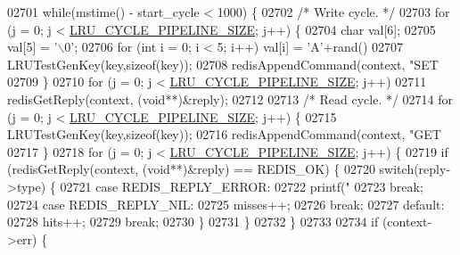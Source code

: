\begin{DoxyCode}
{{{{{{{{{{{{{{{{{{{{{{{{{{{{{{{{{{{{{{{{{{{{{{{{{{{{{{{{{{{{{{{{{{{{{{{{{{{{{{{{{{{{{{{{{{{{{{{{{{{{{{{{{{{{02701         \textcolor{keywordflow}{while}(mstime() - start\_cycle < 1000) \{
02702             \textcolor{comment}{/* Write cycle. */}
02703             \textcolor{keywordflow}{for} (j = 0; j < \hyperlink{redis-cli_8c_ae524234b44cd0249095699ac9f377254}{LRU\_CYCLE\_PIPELINE\_SIZE}; j++) \{
02704                 \textcolor{keywordtype}{char} val[6];
02705                 val[5] = \textcolor{stringliteral}{'\(\backslash\)0'};
02706                 \textcolor{keywordflow}{for} (\textcolor{keywordtype}{int} i = 0; i < 5; i++) val[i] = \textcolor{stringliteral}{'A'}+rand()%
02707                 LRUTestGenKey(key,\textcolor{keyword}{sizeof}(key));
02708                 redisAppendCommand(context, \textcolor{stringliteral}{"SET %
02709             \}
02710             \textcolor{keywordflow}{for} (j = 0; j < \hyperlink{redis-cli_8c_ae524234b44cd0249095699ac9f377254}{LRU\_CYCLE\_PIPELINE\_SIZE}; j++)
02711                 redisGetReply(context, (\textcolor{keywordtype}{void}**)&reply);
02712 
02713             \textcolor{comment}{/* Read cycle. */}
02714             \textcolor{keywordflow}{for} (j = 0; j < \hyperlink{redis-cli_8c_ae524234b44cd0249095699ac9f377254}{LRU\_CYCLE\_PIPELINE\_SIZE}; j++) \{
02715                 LRUTestGenKey(key,\textcolor{keyword}{sizeof}(key));
02716                 redisAppendCommand(context, \textcolor{stringliteral}{"GET %
02717             \}
02718             \textcolor{keywordflow}{for} (j = 0; j < \hyperlink{redis-cli_8c_ae524234b44cd0249095699ac9f377254}{LRU\_CYCLE\_PIPELINE\_SIZE}; j++) \{
02719                 \textcolor{keywordflow}{if} (redisGetReply(context, (\textcolor{keywordtype}{void}**)&reply) == REDIS\_OK) \{
02720                     \textcolor{keywordflow}{switch}(reply->type) \{
02721                         \textcolor{keywordflow}{case} REDIS\_REPLY\_ERROR:
02722                             printf(\textcolor{stringliteral}{"%
02723                             \textcolor{keywordflow}{break};
02724                         \textcolor{keywordflow}{case} REDIS\_REPLY\_NIL:
02725                             misses++;
02726                             \textcolor{keywordflow}{break};
02727                         \textcolor{keywordflow}{default}:
02728                             hits++;
02729                             \textcolor{keywordflow}{break};
02730                     \}
02731                 \}
02732             \}
02733 
02734             \textcolor{keywordflow}{if} (context->err) \{
}}}}}}}}}}}}}}}}}}}}}}}}}}}}}}}}}}}}}}}}}}}}}}}}}}}}}}}}}}}}}}}}}}}}}}}}}}}}}}}}}}}}}}}}}}}}}}}}}}}}}}}}}}}}}}}
\end{DoxyCode}
